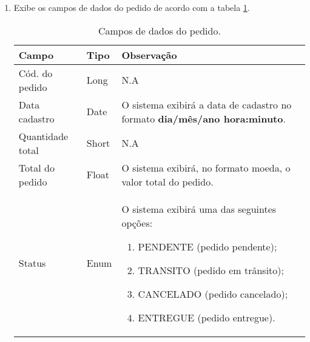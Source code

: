 \begin{enumerate}[label=RN\arabic*]
	\item Exibe os campos de dados do pedido de acordo com a tabela \ref{uc013_tb_rn2}. \label{uc013_rn:2}
	\begin{table}[htb]
		\ABNTEXfontereduzida
		\caption[Campos de dados do pedido]{Campos de dados do pedido.}
		\label{uc013_tb_rn2}
		\begin{tabular}{|p{4.0cm}|p{3.0cm}|p{7.25cm}|}
			\hline
			\textbf{Campo}   & \textbf{Tipo} & \textbf{Observação}                                                                                                                                              \\ \hline
			Cód. do pedido   & Long          & N.A                                                                                                                                                              \\ \hline
			Data cadastro    & Date          & O sistema exibirá a data de cadastro no formato \textbf{dia/mês/ano hora:minuto}.                                                                                \\ \hline
			Quantidade total & Short         & N.A                                                                                                                                                              \\ \hline
			Total do pedido  & Float         & O sistema exibirá, no formato moeda, o valor total do pedido.                                                                                                    \\ \hline
			Status           & Enum          & O sistema exibirá uma das seguintes opções: 
			\begin{enumerate}
				\item PENDENTE (pedido pendente);
				\item TRANSITO (pedido em trânsito);
				\item CANCELADO (pedido cancelado);
				\item ENTREGUE (pedido entregue).
			\end{enumerate}\\ \hline
		\end{tabular}
	\end{table}
\end{enumerate}